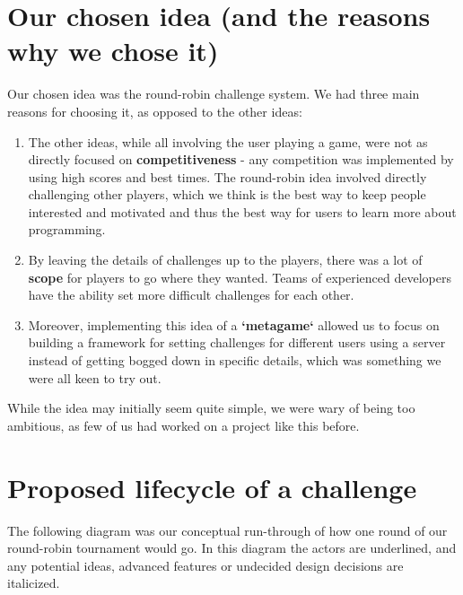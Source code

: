 \documentclass{report}
\begin{document}
\section{Our chosen idea (and the reasons why we chose it)}
Our chosen idea was the round-robin challenge system. We had three main reasons for choosing it, as opposed to the other ideas:
\begin{enumerate}
\item The other ideas, while all involving the user playing a game, were not as directly focused on \textbf{competitiveness} - any competition was implemented by using high scores and best times. The round-robin idea involved directly challenging other players, which we think is the best way to keep people interested and motivated and thus the best way for users to learn more about programming.
\item By leaving the details of challenges up to the players, there was a lot of \textbf{scope} for players to go where they wanted. Teams of experienced developers have the ability set more difficult challenges for each other.
\item Moreover, implementing this idea of a \textbf{`metagame`} allowed us to focus on building a framework for setting challenges for different users using a server instead of getting bogged down in specific details, which was something we were all keen to try out.
\end{enumerate}
While the idea may initially seem quite simple, we were wary of being too ambitious, as few of us had worked on a project like this before.

\section{Proposed lifecycle of a challenge}
The following diagram was our conceptual run-through of how one round of our round-robin tournament would go. In this diagram the actors are underlined, and any potential ideas, advanced features or undecided design decisions are italicized.
\end{document}
